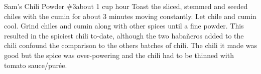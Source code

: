 \begin{recipe}{Sam's Chili Powder \#3}{about 1 cup}{ hour}
Toast the sliced, stemmed and seeded chiles with the cumin for about 3 minutes moving constantly.  Let chile and cumin cool.
Grind chiles and cumin along with other spices until a fine powder.
\freeform This resulted in the spiciest chili to-date, although the two haba\~{n}eros added to the chili confound the comparison to the others batches of chili.  The chili it made was good but the spice was over-powering and the chili had to be thinned with tomato sauce/pur\'{e}e.
\end{recipe}
